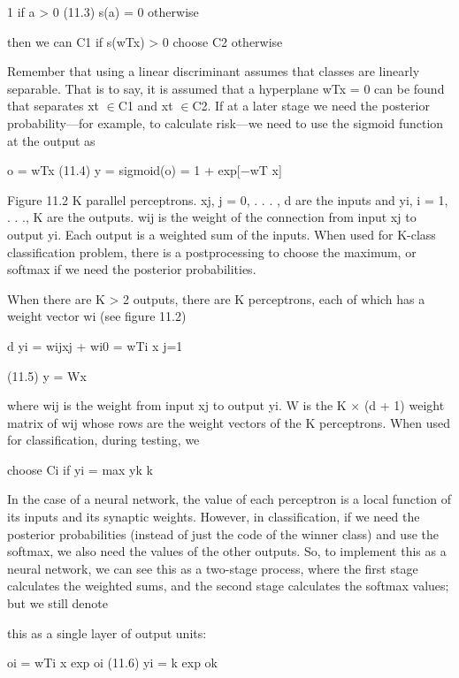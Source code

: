 1 if a > 0 (11.3) s(a) = 0 otherwise

then we can C1 if s(wTx) > 0 choose C2 otherwise

Remember that using a linear discriminant assumes that classes are linearly separable. That is to say, it is assumed that a hyperplane wTx = 0 can be found that separates xt $\in$C1 and xt $\in$C2. If at a later stage we need the posterior probability---for example, to calculate risk---we need to use the sigmoid function at the output as

o = wTx (11.4) y = sigmoid(o) = 1 + exp[$-$wT x]

Figure 11.2 K parallel perceptrons. xj, j = 0, . . . , d are the inputs and yi, i = 1, . . ., K are the outputs. wij is the weight of the connection from input xj to output yi. Each output is a weighted sum of the inputs. When used for K-class classification problem, there is a postprocessing to choose the maximum, or softmax if we need the posterior probabilities.

When there are K > 2 outputs, there are K perceptrons, each of which has a weight vector wi (see figure 11.2)

d yi = wijxj + wi0 = wTi x j=1

(11.5) y = Wx

where wij is the weight from input xj to output yi. W is the K $\times$ (d + 1) weight matrix of wij whose rows are the weight vectors of the K perceptrons. When used for classification, during testing, we

choose Ci if yi = max yk k

In the case of a neural network, the value of each perceptron is a local function of its inputs and its synaptic weights. However, in classification, if we need the posterior probabilities (instead of just the code of the winner class) and use the softmax, we also need the values of the other outputs. So, to implement this as a neural network, we can see this as a two-stage process, where the first stage calculates the weighted sums, and the second stage calculates the softmax values; but we still denote

this as a single layer of output units:

oi = wTi x exp oi (11.6) yi = k exp ok

